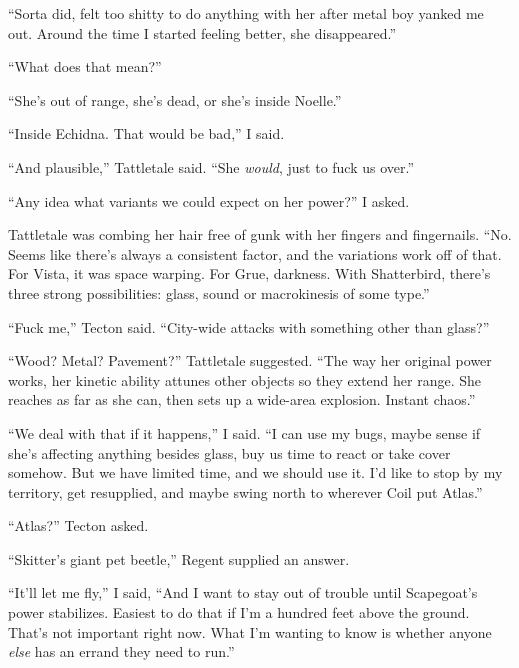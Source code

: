 ``Sorta did, felt too shitty to do anything with her after metal boy yanked me out.  Around the time I started feeling better, she disappeared.''



``What does that mean?''



``She's out of range, she's dead, or she's inside Noelle.''



``Inside Echidna.  That would be bad,'' I said.



``And plausible,'' Tattletale said.  ``She \emph{would}, just to fuck us over.''



``Any idea what variants we could expect on her power?''  I asked.



Tattletale was combing her hair free of gunk with her fingers and fingernails.  ``No.  Seems like there's always a consistent factor, and the variations work off of that.  For Vista, it was space warping.  For Grue, darkness.  With Shatterbird, there's three strong possibilities: glass, sound or macrokinesis of some type.''



``Fuck me,'' Tecton said.  ``City-wide attacks with something other than glass?''



``Wood?  Metal?  Pavement?'' Tattletale suggested.  ``The way her original power works, her kinetic ability attunes other objects so they extend her range.  She reaches as far as she can, then sets up a wide-area explosion.  Instant chaos.''



``We deal with that if it happens,'' I said.  ``I can use my bugs, maybe sense if she's affecting anything besides glass, buy us time to react or take cover somehow.  But we have limited time, and we should use it.  I'd like to stop by my territory, get resupplied, and maybe swing north to wherever Coil put Atlas.''



``Atlas?'' Tecton asked.



``Skitter's giant pet beetle,'' Regent supplied an answer.



``It'll let me fly,'' I said, ``And I want to stay out of trouble until Scapegoat's power stabilizes.  Easiest to do that if I'm a hundred feet above the ground.  That's not important right now.  What I'm wanting to know is whether anyone \emph{else }has an errand they need to run.''



